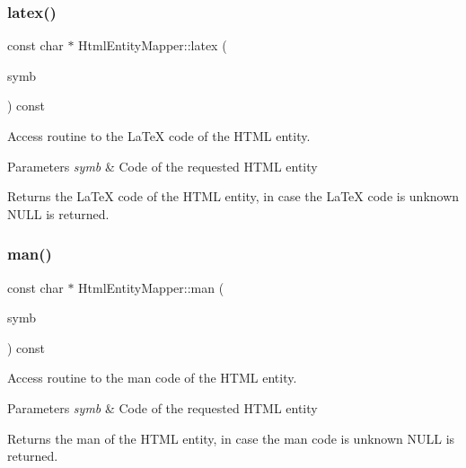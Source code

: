 \subsubsection{\texorpdfstring{latex()}{latex()}}
{\footnotesize\ttfamily const char $\ast$ Html\+Entity\+Mapper\+::latex (\begin{DoxyParamCaption}\item[{Doc\+Symbol\+::\+Sym\+Type}]{symb }\end{DoxyParamCaption}) const}



Access routine to the La\+TeX code of the H\+T\+ML entity. 


\begin{DoxyParams}{Parameters}
{\em symb} & Code of the requested H\+T\+ML entity \\
\hline
\end{DoxyParams}
\begin{DoxyReturn}{Returns}
the La\+TeX code of the H\+T\+ML entity, in case the La\+TeX code is unknown {\ttfamily N\+U\+LL} is returned. 
\end{DoxyReturn}
\mbox{\label{class_html_entity_mapper_aa0c9a67c19af23ac55194d75a900d39f}} 
\subsubsection{\texorpdfstring{man()}{man()}}
{\footnotesize\ttfamily const char $\ast$ Html\+Entity\+Mapper\+::man (\begin{DoxyParamCaption}\item[{Doc\+Symbol\+::\+Sym\+Type}]{symb }\end{DoxyParamCaption}) const}



Access routine to the man code of the H\+T\+ML entity. 


\begin{DoxyParams}{Parameters}
{\em symb} & Code of the requested H\+T\+ML entity \\
\hline
\end{DoxyParams}
\begin{DoxyReturn}{Returns}
the man of the H\+T\+ML entity, in case the man code is unknown {\ttfamily N\+U\+LL} is returned. 
\end{DoxyReturn}
\mbox{\label{class_html_entity_mapper_ae5a015b9df7e2e99420e8fe7d4adbd71}} 
